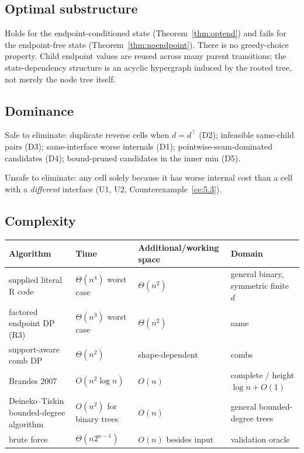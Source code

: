 \documentclass[11pt]{article}
\theoremstyle{plain}
\begin{document}
\subsection{Optimal substructure}

Holds for the endpoint-conditioned state (Theorem~\ref{thm:optend}) and fails
for the endpoint-free state (Theorem~\ref{thm:noendpoint}). There is no
greedy-choice property. Child endpoint values are reused across many parent
transitions; the state-dependency structure is an acyclic hypergraph induced by
the rooted tree, not merely the node tree itself.

\subsection{Dominance}

Safe to eliminate: duplicate reverse cells when \(d = d^\top\) (D2); infeasible
same-child pairs (D3); same-interface worse internals (D1);
pointwise-seam-dominated candidates (D4); bound-pruned candidates in the inner
min (D5).

Unsafe to eliminate: any cell solely because it has worse internal cost than a
cell with a \emph{different} interface (U1, U2, Counterexample~\ref{ce:5.3}).

\subsection{Complexity}

\begin{center}
\renewcommand{\arraystretch}{1.35}
\begin{tabular}{@{}l l l l@{}}
\toprule
Algorithm & Time & Additional/working space & Domain \\
\midrule
supplied literal R code & \(\Theta(n^4)\) worst case & \(\Theta(n^2)\) &
general binary, symmetric finite \(d\) \\
factored endpoint DP (R3) & \(\Theta(n^3)\) worst case & \(\Theta(n^2)\) & same
\\
support-aware comb DP & \(\Theta(n^2)\) & shape-dependent & combs \\
Brandes 2007 & \(O(n^2\log n)\) & \(O(n)\) & complete / height
\(\log n+O(1)\) \\
Deineko--Tiskin bounded-degree algorithm & \(O(n^2)\) for binary trees &
\(O(n)\) & general bounded-degree trees \\
brute force & \(\Theta(n2^{n-1})\) & \(O(n)\) besides input & validation oracle
\\
\bottomrule
\end{tabular}
\end{center}
\end{document}
